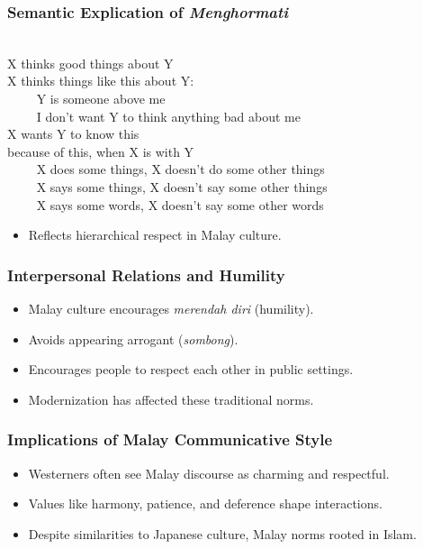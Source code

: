 \documentclass[xetex]{beamer}
\newcommand{\msa}{\mtciteform}
\begin{document}
\begin{frame}
\frametitle{Semantic Explication of \textit{Menghormati}}
\begin{exe}
    \ex [X \msa{menghormati} Y:] \\
    X thinks good things about Y\\
    X thinks things like this about Y:\\
    ~~~~ Y is someone above me\\
    ~~~~ I don’t want Y to think anything bad about me\\
    X wants Y to know this\\
    because of this, when X is with Y\\
    ~~~~ X does some things, X doesn’t do some other things\\
    ~~~~ X says some things, X doesn’t say some other things\\
    ~~~~ X says some words, X doesn’t say some other words\\
\end{exe}
\begin{itemize}
    \item Reflects hierarchical respect in Malay culture.
\end{itemize}
\end{frame}

\begin{frame}
\frametitle{Interpersonal Relations and Humility}
\begin{itemize}
    \item Malay culture encourages \textit{merendah diri} (humility).
    \item Avoids appearing arrogant (\textit{sombong}).
    \item Encourages people to respect each other in public settings.
    \item Modernization has affected these traditional norms.
\end{itemize}
\end{frame}

\begin{frame}
\frametitle{Implications of Malay Communicative Style}
\begin{itemize}
    \item Westerners often see Malay discourse as charming and respectful.
    \item Values like harmony, patience, and deference shape interactions.
    \item Despite similarities to Japanese culture, Malay norms rooted in Islam.
\end{itemize}
\end{frame}
\end{document}
